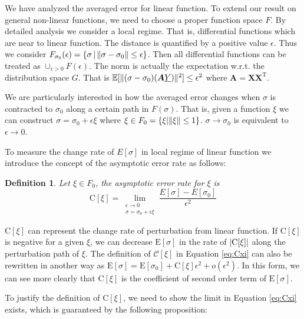 \documentclass[conference]{IEEEtran}
\newtheorem{definition}{Definition}
\DeclarePairedDelimiter\abs{\lvert}{\rvert}
\DeclarePairedDelimiter\norm{\lVert}{\rVert}
\def\E{\mathbb{E}}
\def\T{\mathrm{T}}
\begin{document}
We have analyzed the averaged error for linear function. To extend our result on general non-linear functions, we need to choose a proper function space $F$. By detailed analysis we consider a local regime. That is, differential functions which are near to linear function. The distance is quantified by a positive value $\epsilon$. Thus we consider $F_{\sigma_0}(\epsilon) =\{ \sigma \,|\, \norm{\sigma - \sigma_0} \leq \epsilon\}$. Then all differential functions can be treated as $\cup_{\epsilon>0} F(\epsilon)$. The norm is actually the expectation w.r.t. the distribution space $G$. That is $\E[\norm{(\sigma - \sigma_0)(\bm{A}\underline{Y})}^2] \leq \epsilon^2$
where $\bm{A} = \bm{X}\bm{X}^\T$.


We are particularly interested in how the averaged error changes when $\sigma$ is contracted to $\sigma_0$ along a certain path in $F(\sigma)$. That is, given a function $\xi$ we can construct $\sigma = \sigma_0 + \epsilon \xi$ where $\xi \in F_0 = \{\xi | \norm{\xi} \leq 1 \}$. $\sigma \to \sigma_0$ is equivalent to $\epsilon \to 0$.

To measure the change rate of $E[\sigma]$ in local regime of linear function we introduce the concept of the asymptotic error rate as follows:
\begin{definition}
Let $\xi \in F_0$, the asymptotic error rate for $\xi$ is
\begin{equation}\label{eq:Cxi}
\mathrm{C}[\xi] = \lim_{\substack{\epsilon \to 0 \\ \sigma = \sigma_0 + \epsilon \xi}} \frac{E[\sigma] - E[\sigma_0]}{\epsilon^2}
\end{equation}
\end{definition}

$\mathrm{C}[\xi]$ can represent the change rate of perturbation from linear function. If $\mathrm{C}[\xi]$ is negative for a given $\xi$, we can decrease $\mathrm{E}[\sigma]$ in the rate of $\abs{\mathrm{C}[\xi]}$ along  the perturbation path of $\xi$.
The definition of $\mathcal{C}[\xi]$ in Equation \eqref{eq:Cxi} can also be rewritten in another way as
$\mathrm{E}[\sigma] = \mathrm{E}[\sigma_0] +
\mathrm{C}[\xi]\epsilon^2 + o(\epsilon^2)$. In this form, we can see more clearly that $\mathrm{C}[\xi]$ is the coefficient of second order term of $\mathrm{E}[\sigma]$.

To justify the definition of $\mathrm{C}[\xi]$, we need to show the limit in Equation \eqref{eq:Cxi} exists, which is guaranteed by the following proposition:
\end{document}
